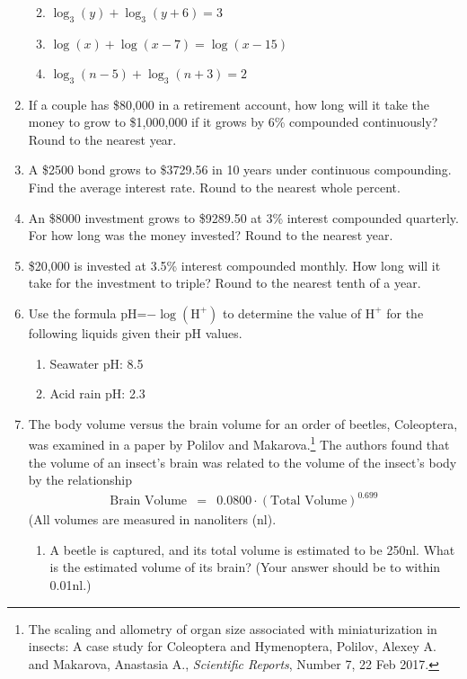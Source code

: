 \begin{enumerate}
\begin{enumerate}
\clearpage
\item $\log_3(y)+\log_3(y+6)=3$\vfill
\item $\log(x)+\log(x-7)=\log(x-15)$\vfill
\item $\log_3(n-5)+\log_3(n+3)=2$\vfill

\end{enumerate}

\clearpage



\item If a couple has \$80,000 in a retirement account, how long will it take the money to grow to \$1,000,000 if it grows by 6\% compounded continuously?  Round to the nearest year.\vfill

\item A \$2500 bond grows to \$3729.56 in 10 years under continuous compounding.  Find the average interest rate.  Round to the nearest whole percent.\vfill


\item An \$8000 investment grows to \$9289.50 at 3\% interest compounded quarterly.  For how long was the money invested?  Round to the nearest year.\vfill

\clearpage

\item \$20,000 is invested at 3.5\% interest compounded monthly.  How long will it take for the investment to triple?  Round to the nearest tenth of a year.\vfill
\vfill
\vfill

\item Use the formula pH=$-\log(\text{H}^+)$ to determine the value of $\text{H}^+$ for the following liquids given their pH values.
\begin{enumerate}
\item Seawater pH:  8.5 \vfill
\item Acid rain pH:  2.3\vfill
\end{enumerate}

\clearpage

\item The body volume versus the brain volume for an order of beetles,
  Coleoptera, was examined in a paper by Polilov and
  Makarova.\footnote{The scaling and allometry of organ size
    associated with miniaturization in insects: A case study for
    Coleoptera and Hymenoptera, Polilov, Alexey A. and Makarova,
    Anastasia A., \textit{Scientific Reports}, Number 7, 22 Feb 2017.}
  The authors found that the volume of an insect's brain was related
  to the volume of the insect's body by the relationship
  \begin{eqnarray*}
    \textrm{Brain Volume} & = & 0.0800 \cdot \left( \textrm{Total Volume} \right)^{0.699}
  \end{eqnarray*}
  (All volumes are measured in nanoliters (nl).
  \begin{enumerate}
  \item A beetle is captured, and its total volume is estimated to be
    250nl. What is the estimated volume of its brain? (Your answer
    should be to within 0.01nl.)
      

\end{enumerate}
\end{enumerate}
